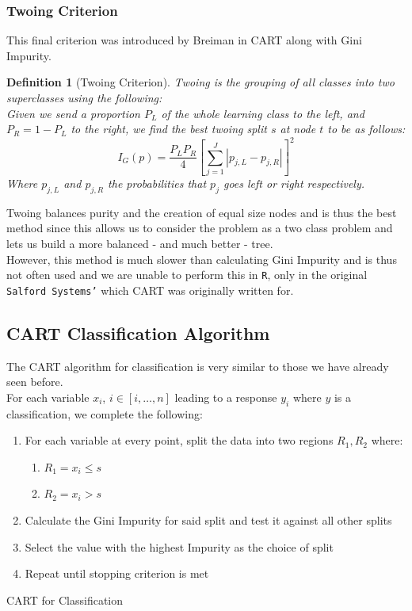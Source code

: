 \documentclass[11pt,a4paper]{report}
\newtheorem{definition}{Definition}
\begin{document}
\subsubsection{Twoing Criterion}
This final criterion was introduced by Breiman in CART \cite{BreimanDT} along with Gini Impurity.
\begin{definition}[Twoing Criterion]
    Twoing is the grouping of all classes into two superclasses using the following:\\
    Given we send a proportion $P_L$ of the whole learning class to the left, and $P_R = 1 - P_L$ to the right, we find the best twoing split $s$ at node $t$ to be as follows:
    \begin{equation}
        I_G (p) = \frac{P_L P_R}{4} \left[ \sum_{j=1}^{J} \left| p_{j,L} - p_{j,R} \right| \right]^2
        \label{eq:twoing}
    \end{equation}
    Where $p_{j,L}$ and $p_{j,R}$ the probabilities that $p_j$ goes left or right respectively.
\end{definition}
Twoing balances purity and the creation of equal size nodes and is thus the best method since this allows us to consider the problem as a two class problem and lets us build a more balanced - and much better - tree.\\
However, this method is much slower than calculating Gini Impurity and is thus not often used and we are unable to perform this in {\color{blue} \texttt{R}}, only in the original {\color{blue} \texttt{Salford Systems'}} which CART was originally written for.



\subsection{CART Classification Algorithm}
The CART algorithm for classification is very similar to those we have already seen before. \\
For each variable $x_i$, $i \in [i, \dots, n]$ leading to a response $y_i$ where $y$ is a classification, we complete the following:
\begin{algorithm}
\begin{enumerate}
    \item For each variable at every point, split the data into two regions $R_1, R_2$ where:
    \begin{enumerate}
        \item $R_1 = x_i \leq s$
        \item $R_2 = x_i > s$
    \end{enumerate}
    
    \item Calculate the Gini Impurity for said split and test it against all other splits
    
    \item Select the value with the highest Impurity as the choice of split
    
    \item Repeat until stopping criterion is met
\end{enumerate}
\caption{CART for Classification}
\end{algorithm}
\end{document}
